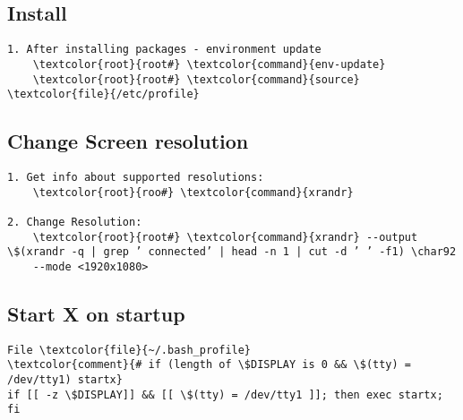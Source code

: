 \documentclass[10pt, a4paper, onecolumn, openany]{book}         %
\begin{document}
\subsection{Install}
\begin{Verbatim}[commandchars=\\\{\}]
1. After installing packages - environment update
    \textcolor{root}{root#} \textcolor{command}{env-update}
    \textcolor{root}{root#} \textcolor{command}{source} \textcolor{file}{/etc/profile}
\end{Verbatim}

\subsection{Change Screen resolution}
\begin{Verbatim}[commandchars=\\\{\}]
1. Get info about supported resolutions:
    \textcolor{root}{roo#} \textcolor{command}{xrandr}
    
2. Change Resolution:
    \textcolor{root}{root#} \textcolor{command}{xrandr} --output \$(xrandr -q | grep ’ connected’ | head -n 1 | cut -d ’ ’ -f1) \char92
    --mode <1920x1080>
\end{Verbatim}

\subsection{Start X on startup}
\begin{Verbatim}[commandchars=\\\{\}]
File \textcolor{file}{~/.bash_profile}
\textcolor{comment}{# if (length of \$DISPLAY is 0 && \$(tty) = /dev/tty1) startx}
if [[ -z \$DISPLAY]] && [[ \$(tty) = /dev/tty1 ]]; then exec startx; fi
\end{Verbatim}



\newpage
\end{document}
